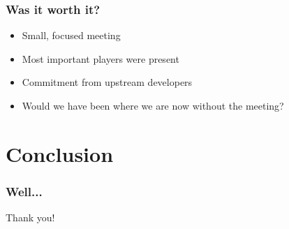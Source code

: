 \documentclass{beamer}
\begin{document}
\begin{frame}
  \frametitle{Was it worth it?}
	\begin{itemize}
	\item
		Small, focused meeting
	\item
		Most important players were present
	\item
		Commitment from upstream developers
	\item
		Would we have been where we are now without the meeting?
	\end{itemize}
\end{frame}

\section{Conclusion}

\begin{frame}
  \frametitle{Well...}
	\begin{center}
		\huge{Thank you!}
	\end{center}
\end{frame}
\end{document}
